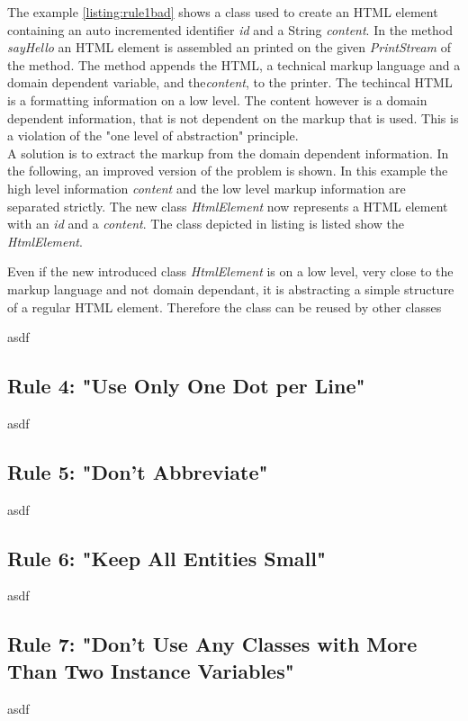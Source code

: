 %
\label{listing:rule1bad}

The example \ref{listing:rule1bad} shows a class used to create an \acf{HTML} element containing an auto incremented identifier \textit{id} and a String \textit{content}. In the method \textit{sayHello} an \acf{HTML} element is assembled an printed on the given \textit{PrintStream} of the method. The method appends the \acf{HTML}, a technical markup language and a domain dependent variable, and the\textit{content}, to the printer. The techincal \acf{HTML} is a formatting information on a low level. The content however is a domain dependent information, that is not dependent on the markup that is used. This is a violation of the "one level of abstraction" principle.\\

A solution is to extract the markup from the domain dependent information. In the following, an improved version of the problem is shown. In this example the high level information \textit{content} and the low level markup information are separated strictly. The new class \textit{HtmlElement} now represents a \acf{HTML} element with an \textit{id} and a \textit{content}. The class depicted in listing \label{listing:rule1good:element} is listed show the \textit{HtmlElement}. 

%
\label{listing:rule1good:element}

Even if the new introduced class \textit{HtmlElement} is on a low level, very close to the markup language and not domain dependant, it is abstracting a simple structure of a regular \acf{HTML} element. Therefore the class can be reused by other classes 




asdf
\subsection{Rule 4: "Use Only One Dot per Line"}
asdf
\subsection{Rule 5: "Don't Abbreviate"}
asdf
\subsection{Rule 6: "Keep All Entities Small"}
asdf
\subsection{Rule 7: "Don’t Use Any Classes with More Than Two Instance Variables"}
asdf
